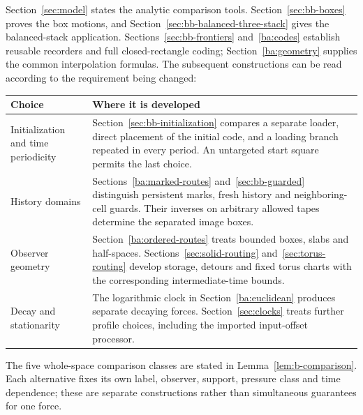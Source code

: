 Section~\ref{sec:model} states the analytic comparison tools.
Section~\ref{sec:bb-boxes} proves the box motions, and
Section~\ref{sec:bb-balanced-three-stack} gives the balanced-stack application.
Sections~\ref{sec:bb-frontiers} and~\ref{ba:codes} establish reusable
recorders and full closed-rectangle coding; Section~\ref{ba:geometry}
supplies the common interpolation formulas. The subsequent constructions
can be read according to the requirement being changed:
\begin{center}
\begin{tabular}{@{}p{}p{}@{}}
\toprule
Choice & Where it is developed \\
\midrule
Initialization and time periodicity &
Section~\ref{sec:bb-initialization} compares a separate loader, direct
placement of the initial code, and a loading branch repeated in every
period. An untargeted start square permits the last choice. \\[4pt]
History domains &
Sections~\ref{ba:marked-routes} and~\ref{sec:bb-guarded} distinguish
persistent marks, fresh history and neighboring-cell guards. Their
inverses on arbitrary allowed tapes determine the separated image boxes.
\\[4pt]
Observer geometry &
Section~\ref{ba:ordered-routes} treats bounded boxes, slabs and
half-spaces. Sections~\ref{sec:solid-routing} and~\ref{sec:torus-routing}
develop storage, detours and fixed torus charts with the corresponding
intermediate-time bounds. \\[4pt]
Decay and stationarity &
The logarithmic clock in Section~\ref{ba:euclidean} produces separate
decaying forces. Section~\ref{sec:clocks} treats further profile choices,
including the imported input-offset processor. \\
\bottomrule
\end{tabular}
\end{center}
The five whole-space comparison classes are stated in
Lemma~\ref{lem:b-comparison}. Each alternative fixes its own label,
observer, support, pressure class and time dependence; these are separate
constructions rather than simultaneous guarantees for one force.
